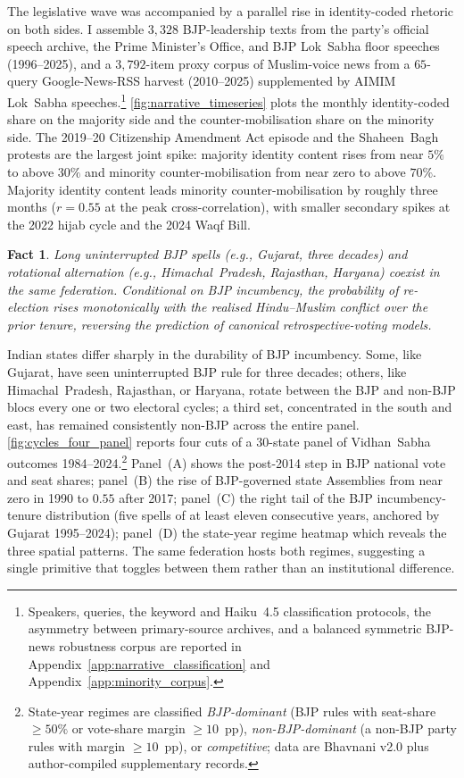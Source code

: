 \documentclass[11pt,twoside]{extarticle}
\newtheorem{fact}{Fact}
\begin{document}
The legislative wave was accompanied by a parallel rise in identity-coded rhetoric on both sides. I assemble $3{,}328$ BJP-leadership texts from the party's official speech archive, the Prime Minister's Office, and BJP Lok~Sabha floor speeches (1996--2025), and a $3{,}792$-item proxy corpus of Muslim-voice news from a $65$-query Google-News-RSS harvest (2010--2025) supplemented by AIMIM Lok~Sabha speeches.\footnote{Speakers, queries, the keyword and Haiku~4.5 classification protocols, the asymmetry between primary-source archives, and a balanced symmetric BJP-news robustness corpus are reported in Appendix~\ref{app:narrative_classification} and Appendix~\ref{app:minority_corpus}.} \autoref{fig:narrative_timeseries} plots the monthly identity-coded share on the majority side and the counter-mobilisation share on the minority side. The 2019--20 Citizenship Amendment Act episode and the Shaheen~Bagh protests are the largest joint spike: majority identity content rises from near $5\%$ to above $30\%$ and minority counter-mobilisation from near zero to above $70\%$. Majority identity content leads minority counter-mobilisation by roughly three months ($r=0.55$ at the peak cross-correlation), with smaller secondary spikes at the 2022 hijab cycle and the 2024 Waqf Bill.

\begin{fact}\label{fact:2}
Long uninterrupted BJP spells (e.g., Gujarat, three decades) and rotational alternation (e.g., Himachal~Pradesh, Rajasthan, Haryana) coexist in the same federation. Conditional on BJP incumbency, the probability of re-election rises monotonically with the realised Hindu--Muslim conflict over the prior tenure, reversing the prediction of canonical retrospective-voting models.
\end{fact}

Indian states differ sharply in the durability of BJP incumbency. Some, like Gujarat, have seen uninterrupted BJP rule for three decades; others, like Himachal~Pradesh, Rajasthan, or Haryana, rotate between the BJP and non-BJP blocs every one or two electoral cycles; a third set, concentrated in the south and east, has remained consistently non-BJP across the entire panel. \autoref{fig:cycles_four_panel} reports four cuts of a 30-state panel of Vidhan~Sabha outcomes 1984--2024.\footnote{State-year regimes are classified \emph{BJP-dominant} (BJP rules with seat-share $\ge 50\%$ or vote-share margin $\ge 10$~pp), \emph{non-BJP-dominant} (a non-BJP party rules with margin $\ge 10$~pp), or \emph{competitive}; data are Bhavnani v2.0 plus author-compiled supplementary records.} Panel~(A) shows the post-2014 step in BJP national vote and seat shares; panel~(B) the rise of BJP-governed state Assemblies from near zero in 1990 to $0.55$ after 2017; panel~(C) the right tail of the BJP incumbency-tenure distribution (five spells of at least eleven consecutive years, anchored by Gujarat 1995--2024); panel~(D) the state-year regime heatmap which reveals the three spatial patterns. The same federation hosts both regimes, suggesting a single primitive that toggles between them rather than an institutional difference.
\end{document}
